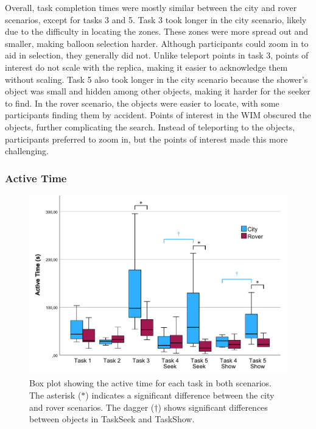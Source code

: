             Overall, task completion times were mostly similar between the city and rover scenarios, except for tasks 3 and 5. Task 3 took longer in the city scenario, likely due to the difficulty in locating the zones. These zones were more spread out and smaller, making balloon selection harder. Although participants could zoom in to aid in selection, they generally did not. Unlike teleport points in task 3, points of interest do not scale with the replica, making it easier to acknowledge them without scaling. Task 5 also took longer in the city scenario because the shower's object was small and hidden among other objects, making it harder for the seeker to find. In the rover scenario, the objects were easier to locate, with some participants finding them by accident. Points of interest in the WIM obscured the objects, further complicating the search. Instead of teleporting to the objects, participants preferred to zoom in, but the points of interest made this more challenging.


        \subsubsection{Active Time}

   
            \begin{figure}[h!]
                \centering
                \includegraphics[width=1\linewidth]{figures/active_time_graph.pdf}
                \caption{Box plot showing the active time for each task in both scenarios. The asterisk ($\ast$) indicates a significant difference between the city and rover scenarios. The dagger ($\dag$)  shows significant differences between objects in TaskSeek and TaskShow.}
                \label{fig:active_time}
            \end{figure}

